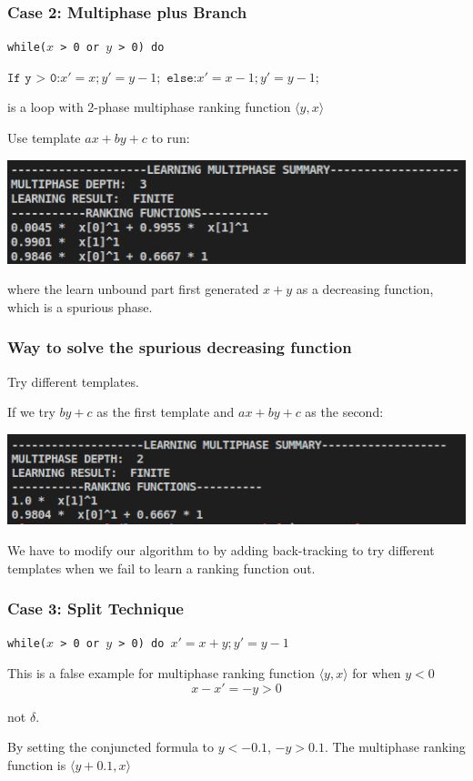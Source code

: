 \documentclass[10pt]{beamer}
\begin{document}
\begin{frame}\frametitle{Case 2: Multiphase plus Branch}
\begin{example}
\texttt{while($x$ > 0 or $y$ > 0) do }

$\texttt{If y > 0:} x' = x; y' = y - 1;$
$\texttt{else:} x' = x - 1; y' = y - 1;$


\end{example}

is a loop with 2-phase multiphase ranking function $\langle y, x\rangle$

Use template $ax + by + c$ to run:
\begin{center}
\includegraphics[scale= 0.5]{7.png}
\end{center}
where the learn unbound part first generated $x + y$ as a decreasing function, which is a spurious phase.
\end{frame}

\begin{frame}\frametitle{Way to solve the spurious decreasing function}
Try different templates.

If we try $by + c$ as the first template and $ax + by + c$ as the second:

\begin{center}

\includegraphics[scale= 0.5]{3.png}
\end{center}

We have to modify our algorithm to by adding back-tracking to try different templates when we fail to learn a ranking function out. 
\end{frame}

\begin{frame}\frametitle{Case 3: Split Technique}
\begin{example}
\texttt{while($x$ > 0 or $y$ > 0) do }$x' = x + y; y' = y - 1$

This is a false example for multiphase ranking function $\langle y,x\rangle$ for when $y < 0$ 
\[ x - x' = -y > 0\]

not $\delta$.



\end{example}

By setting the conjuncted formula to $ y < -0.1$,
 $-y > 0.1$. The multiphase ranking function is $\langle y+0.1, x\rangle$


\end{frame}
\end{document}
